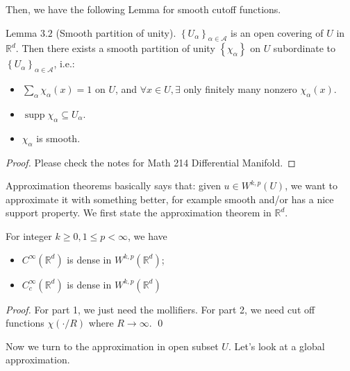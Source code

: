 Then, we have the following Lemma for smooth cutoff functions. 
\begin{lemma}
Lemma $3.2$ (Smooth partition of unity). $\left\{U_{\alpha}\right\}_{\alpha \in \mathcal{A}}$ is an open covering of $U$ in $\mathbb{R}^{d}$. Then there exists a smooth partition of unity $\left\{\chi_{\alpha}\right\}$ on $U$ subordinate to $\left\{U_{\alpha}\right\}_{\alpha \in \mathcal{A}}$, i.e.:
\begin{itemize}
    \item $\sum_{\alpha} \chi_{\alpha}(x)=1$ on $U$, and $\forall x \in U, \exists$ only finitely many nonzero $\chi_{\alpha}(x)$.
    \item $\operatorname{supp} \chi_{\alpha} \subseteq U_{\alpha}$.
    \item $\chi_{\alpha}$ is smooth.
\end{itemize}
\end{lemma}
\vspace{0.2em}
\begin{proof}
Please check the notes for Math 214 Differential Manifold.
\end{proof}

Approximation theorems basically says that: given $u \in W^{k, p}(U)$, we want to approximate it with something better, for example smooth and/or has a nice support property.
We first state the approximation theorem in $\mathbb{R}^{d}$.

\begin{theorem}
For integer $k \geq 0,1 \leq p<\infty$, we have
\begin{itemize}
    \item $C^{\infty}\left(\mathbb{R}^{d}\right)$ is dense in $W^{k, p}\left(\mathbb{R}^{d}\right)$;
    \item $C_{c}^{\infty}\left(\mathbb{R}^{d}\right)$ is dense in $W^{k, p}\left(\mathbb{R}^{d}\right)$
\end{itemize}
\end{theorem}
\begin{proof}
    For part 1, we just need the mollifiers. For part 2, we need cut off functions $\chi(\cdot/ R)$ where $R\to \infty$. 
    \qed 
\end{proof}

Now we turn to the approximation in open subset $U$. Let's look at a global approximation. 

